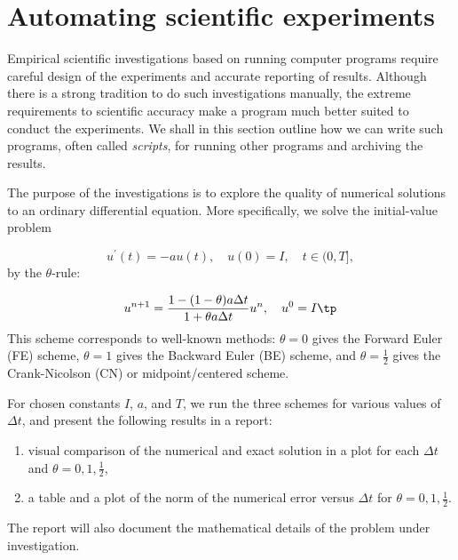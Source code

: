 \documentclass[graybox,sectrefs,envcountresetchap,open=right,final]{svmonodo}
\newenvironment{notice_mdfboxadmon}[1][]{
\begin{notice_mdfboxmdframed}[frametitle=#1]
}
{
\end{notice_mdfboxmdframed}
}
\begin{document}
\section{Automating scientific experiments}
\label{softeng1:experiments}

Empirical scientific investigations based on running computer programs
require careful design of the experiments and accurate reporting of results.
Although there is a strong tradition to do such investigations manually,
the extreme requirements to scientific accuracy make a program much
better suited to conduct the experiments. We shall in this section outline
how we can write such programs, often called \emph{scripts}, for running other
programs and archiving the results.


\begin{notice_mdfboxadmon}
The purpose of the investigations is to explore the quality of numerical
solutions to an ordinary differential equation. More specifically, we
solve the initial-value problem

\begin{equation}
u^\prime(t) = -au(t),\quad u(0)=I,\quad t\in (0,T],
\label{softeng1:experiments:model}
\end{equation}
by the $\theta$-rule:

\begin{equation}
u^{n+1} = \frac{1 - (1-\theta) a\Delta t}{1 + \theta a\Delta t}u^n,
\quad u^0=I\tp
\label{softeng1:experiments:theta}
\end{equation}
This scheme corresponds to well-known methods: $\theta=0$ gives the
Forward Euler (FE) scheme, $\theta=1$ gives the Backward Euler (BE) scheme,
and $\theta=\frac{1}{2}$ gives the Crank-Nicolson
(CN) or midpoint/centered scheme.

For chosen constants $I$, $a$, and $T$, we run the three schemes for various
values of $\Delta t$, and present the following results in a report:

\begin{enumerate}
\item visual comparison of the numerical and exact solution in a plot for
   each $\Delta t$ and $\theta=0,1,\frac{1}{2}$,

\item a table and a plot of the norm of the numerical error versus $\Delta t$
   for $\theta=0,1,\frac{1}{2}$.
\end{enumerate}

\noindent
The report will also document the mathematical details of the problem under
investigation.
\end{notice_mdfboxadmon}
\end{document}

